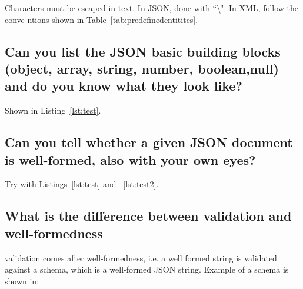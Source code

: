 \documentclass{article}
\begin{document}
Characters must be escaped in text. In JSON, done with ``\textbackslash". In XML, follow the conve
ntions shown in Table~\ref{tab:predefinedentitites}.

\subsection{Can you list the JSON basic building blocks (object, array, string, number, boolean,null) and do you know what they look like?}

Shown in Listing~\ref{lst:test}.

\subsection{Can you tell whether a given JSON document is well-formed, also with your own eyes?}

Try with Listings~\ref{lst:test} and ~\ref{lst:test2}.

\subsection{What is the difference between validation and well-formedness}\label{diffwellformedvalidity}

validation comes after well-formedness, i.e. a well formed string is validated against a schema, which is a well-formed JSON string. Example of a schema is shown in:
\end{document}

